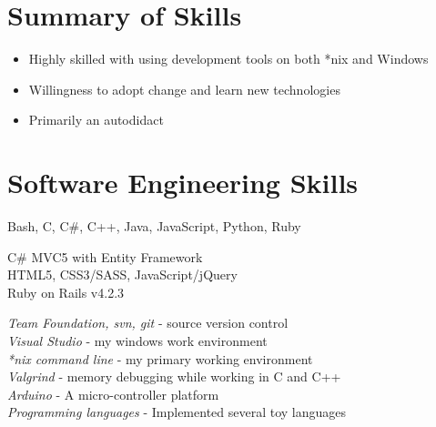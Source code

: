 \documentclass[10pt]{article} %
\begin{document}

\vspace{-4mm}
\section{Summary of Skills}
\vspace{-3mm}

\begin{itemize}
\item Highly skilled with using development tools on both *nix and Windows
\vspace{-3mm}
\item Willingness to adopt change and learn new technologies
\vspace{-3mm}
\item Primarily an autodidact
\vspace{-3mm}
\end{itemize}

\section{Software Engineering Skills}
\vspace{-3mm}

{
  Bash, C, C\#, C++, Java, JavaScript, Python, Ruby
}


{
  C\# MVC5 with Entity Framework \\
  HTML5, CSS3/SASS, JavaScript/jQuery \\
  Ruby on Rails v4.2.3
}


{
\textit{Team Foundation, svn, git} - source version control \\
\textit{Visual Studio} - my windows work environment \\
\textit{*nix command line} - my primary working environment \\
\textit{Valgrind} - memory debugging while working in C and C++ \\
\textit{Arduino} - A micro-controller platform \\
\textit{Programming languages} - Implemented several toy languages
}
\end{document}
